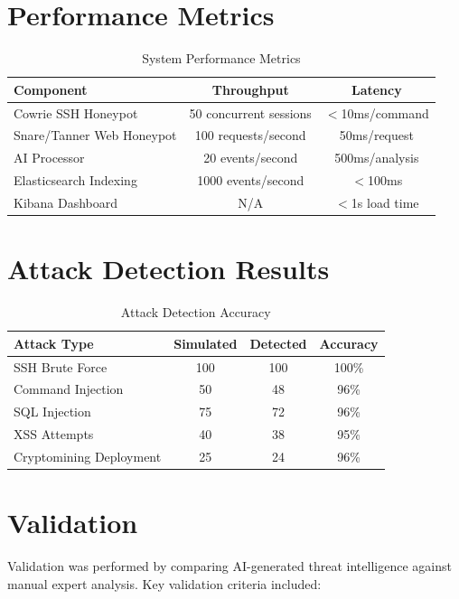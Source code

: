\documentclass[12pt,a4paper]{report}
\begin{document}
\section{Performance Metrics}

\begin{table}[h]
\centering
\caption{System Performance Metrics}
\label{tab:performance_metrics}
\begin{tabular}{|l|c|c|}
\hline
\textbf{Component} & \textbf{Throughput} & \textbf{Latency} \\
\hline
Cowrie SSH Honeypot & 50 concurrent sessions & $<$10ms/command \\
\hline
Snare/Tanner Web Honeypot & 100 requests/second & 50ms/request \\
\hline
AI Processor & 20 events/second & 500ms/analysis \\
\hline
Elasticsearch Indexing & 1000 events/second & $<$100ms \\
\hline
Kibana Dashboard & N/A & $<$1s load time \\
\hline
\end{tabular}
\end{table}

\section{Attack Detection Results}

\begin{table}[h]
\centering
\caption{Attack Detection Accuracy}
\label{tab:attack_detection}
\begin{tabular}{|l|c|c|c|}
\hline
\textbf{Attack Type} & \textbf{Simulated} & \textbf{Detected} & \textbf{Accuracy} \\
\hline
SSH Brute Force & 100 & 100 & 100\% \\
\hline
Command Injection & 50 & 48 & 96\% \\
\hline
SQL Injection & 75 & 72 & 96\% \\
\hline
XSS Attempts & 40 & 38 & 95\% \\
\hline
Cryptomining Deployment & 25 & 24 & 96\% \\
\hline
\end{tabular}
\end{table}

\section{Validation}

Validation was performed by comparing AI-generated threat intelligence against manual expert analysis. Key validation criteria included:
\end{document}
